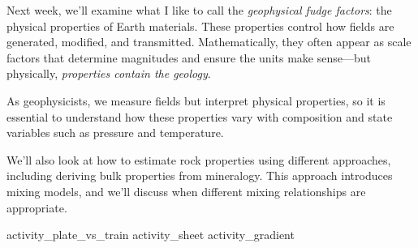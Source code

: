 
Next week, we'll examine what I like to call the \emph{geophysical fudge factors}: the physical properties of Earth materials.  These properties control how fields are generated, modified, and transmitted. Mathematically, they often appear as scale factors that determine magnitudes and ensure the units make sense---but physically, \emph{properties contain the geology}.

As geophysicists, we measure fields but interpret physical properties, so it is essential to understand how these properties vary with composition and state variables such as pressure and temperature.

We'll also look at how to estimate rock properties using different approaches, including deriving bulk properties from mineralogy. This approach introduces mixing models, and we'll discuss when different mixing relationships are appropriate.

\workshopend
\notepage
\notepage

{activity_plate_vs_train}
{activity_sheet}
{activity_gradient}

